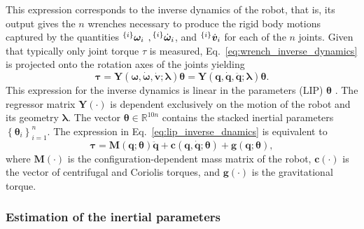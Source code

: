 This expression corresponds to the inverse dynamics of the robot, that is, its output gives the $n$ wrenches necessary to produce the rigid body motions captured by the quantities ${}^{\left\lbrace i \right\rbrace}\bm{\omega}_i$ $,{}^{\left\lbrace i \right\rbrace}\dot{\bm{\omega}}_i$, and ${}^{\left\lbrace i \right\rbrace}\dot{\bm{v}}_i$ for each of the $n$ joints. Given that typically only joint torque $\tau$ is measured, Eq.~\eqref{eq:wrench_inverse_dynamics} is projected onto the rotation axes of the joints \cite{Siciliano2007SpringerHandbookRobotics} yielding
\begin{equation}\label{eq:lip_inverse_dnamics}
\bm{\tau} = \bm{Y}\left(
\bm{\omega},\dot{\bm{\omega}},\dot{\bm{v}}
;\bm{\lambda}\right)\bm{\theta} = \bm{Y}\left(\bm{q},\dot{\bm{q}},\ddot{\bm{q}};\bm{\lambda}\right)\bm{\theta}.
\end{equation}
This expression for the inverse dynamics is linear in the parameters (LIP) $\bm{\theta}$ . The regressor matrix $\bm{Y}\left(\cdot\right)$ is dependent exclusively on the motion of the robot and its geometry $\bm{\lambda}$. The vector $\bm{\theta} \in \mathbb{R}^{10n}$ contains the stacked inertial parameters $\left\lbrace \bm{\theta}_i \right\rbrace^n_{i=1}$. The expression in Eq.~\eqref{eq:lip_inverse_dnamics} is equivalent to
\begin{equation}
	\bm{\tau} = \bm{M}\left(\bm{q};\bm{\theta}\right)\ddot{\bm{q}} + \bm{c}\left(\bm{q},\dot{\bm{q}};\bm{\theta}\right) + \bm{g}\left(\bm{q};\bm{\theta}\right),
\end{equation}
where $\bm{M}(\cdot)$ is the configuration-dependent mass matrix of the robot, $\bm{c}(\cdot)$ is the vector of centrifugal and Coriolis torques, and $\bm{g}(\cdot)$ is the gravitational torque. 

\subsubsection{Estimation of the inertial parameters}


